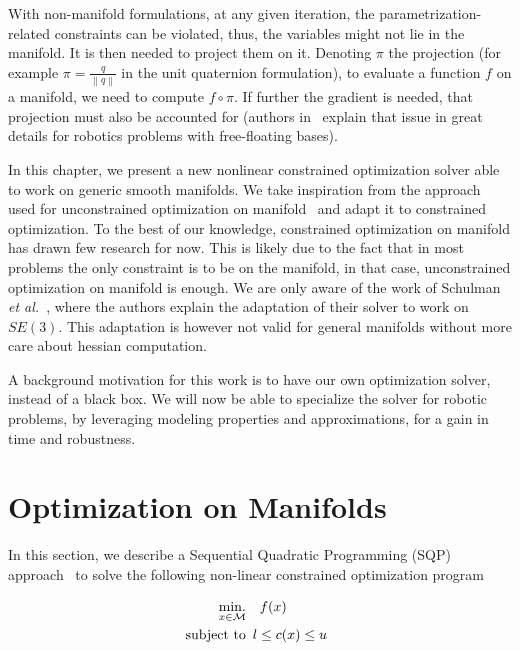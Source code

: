 With non-manifold formulations, at any given iteration, the parametrization-related constraints can be violated, thus, the variables might not lie in the manifold.
It is then needed to project them on it.
Denoting $\pi$ the projection (for example $\pi = \frac{q}{\left\|q\right\|}$ in the unit quaternion formulation), to evaluate a function $f$ on a manifold, we need to compute $f \circ \pi$.
If further the gradient is needed, that projection must also be accounted for (authors in~\cite{bouyarmane:humanoids:2012} explain that issue in great details for robotics problems with free-floating bases).

In this chapter, we present a new nonlinear constrained optimization solver able to work on generic smooth manifolds.
We take inspiration from the approach used for unconstrained optimization on manifold~\cite{absil:book:2008} and adapt it to constrained optimization.
To the best of our knowledge, constrained optimization on manifold has drawn few research for now.
This is likely due to the fact that in most problems the only constraint is to be on the manifold, in that case, unconstrained optimization on manifold is enough.
We are only aware of the work of Schulman \emph{et al.}~\cite{Schulman2014}, where the authors explain the adaptation of their solver to work on $SE(3)$.
This adaptation is however not valid for general manifolds without more care about hessian computation.

A background motivation for this work is to have our own optimization solver, instead of a black box.
We will now be able to specialize the solver for robotic problems, by leveraging modeling properties and approximations, for a gain in time and robustness.

\section{Optimization on Manifolds}
\label{sec:optimization_on_manifolds}

In this section, we describe a Sequential Quadratic Programming (SQP) approach~\cite{nocedal:book:2006} to solve the following non-linear constrained optimization program

\begin{align}
\label{eq:optim_problem}
  \operatorname*{min.}_{x \in \mathcal{M}} & \quad f(x)\\
  \text{subject to}&
  \begin{array}{lr}
    l \leq c(x) \leq u \nonumber
  \end{array}
\end{align}

